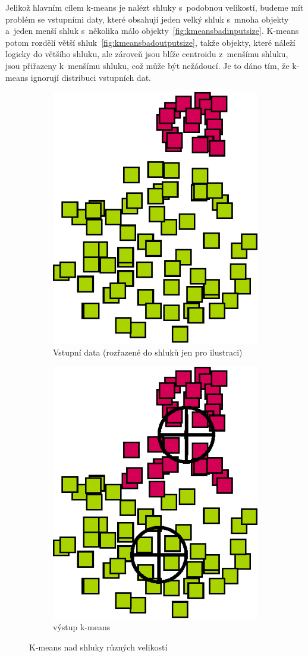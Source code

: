 Jelikož hlavním cílem k-means je nalézt shluky s~podobnou velikostí, budeme mít problém se vstupními daty, které obsahují jeden velký shluk s~mnoha objekty a~jeden menší shluk s~několika málo objekty~\autoref{fig:kmeansbadinputsize}. K-means potom rozdělí větší shluk~\autoref{fig:kmeansbadoutputsize}, takže objekty, které náleží logicky do většího shluku, ale zároveň jsou blíže centroidu z~menšímu shluku, jsou přiřazeny k~menšímu shluku, což může být nežádoucí. Je to dáno tím, že k-means ignorují distribuci vstupních dat.

\begin{figure}[h]
\centering
\begin{subfigure}{.49\textwidth}
  \centering
  \includegraphics[width=.5\linewidth]{img/kmeans_badInputSampleSize.eps}
  \caption{Vstupní data (rozřazené do shluků jen pro ilustraci)}
  \label{fig:kmeansbadinputsize}
\end{subfigure}
\begin{subfigure}{.49\textwidth}
  \centering
  \includegraphics[width=.5\linewidth]{img/kmeans_badOutputSampleSize.eps}
  \caption{výstup k-means}
  \label{fig:kmeansbadoutputsize}
\end{subfigure}
\caption{K-means nad shluky různých velikostí}
\end{figure}

